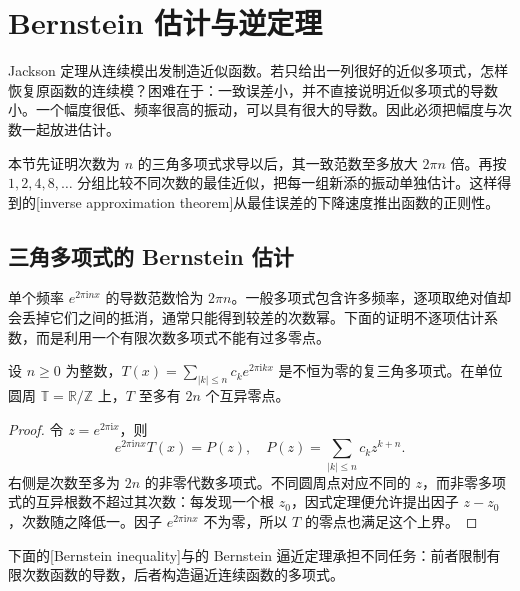 \section{Bernstein 估计与逆定理}
\label{b2:sec:approximation-inverse}

Jackson 定理从连续模出发制造近似函数。若只给出一列很好的近似多项式，怎样恢复原函数的连续模？困难在于：一致误差小，并不直接说明近似多项式的导数小。一个幅度很低、频率很高的振动，可以具有很大的导数。因此必须把幅度与次数一起放进估计。

\ProseParagraphBreak

本节先证明次数为 \(n\) 的三角多项式求导以后，其一致范数至多放大 \(2\pi n\) 倍。再按 \(1,2,4,8,\ldots\) 分组比较不同次数的最佳近似，把每一组新添的振动单独估计。这样得到的[inverse approximation theorem]从最佳误差的下降速度推出函数的正则性。

\subsection{三角多项式的 Bernstein 估计}
\label{b2:subsec:020903}

单个频率 \(e^{2\pi\mathrm i nx}\) 的导数范数恰为 \(2\pi n\)。一般多项式包含许多频率，逐项取绝对值却会丢掉它们之间的抵消，通常只能得到较差的次数幂。下面的证明不逐项估计系数，而是利用一个有限次数多项式不能有过多零点。

\begin{lemma}
\label{b2:lem:approximation-trigonometric-zeros}
设 \(n\geq0\) 为整数，\(T(x)=\sum_{|k|\leq n}c_ke^{2\pi\mathrm i kx}\) 是不恒为零的复三角多项式。在单位圆周 \(\mathbb T=\mathbb R/\mathbb Z\) 上，\(T\) 至多有 \(2n\) 个互异零点。
\end{lemma}
\begin{proof}
令 \(z=e^{2\pi\mathrm i x}\)，则
\[
 e^{2\pi\mathrm i nx}T(x)=P(z),
 \quad P(z)=\sum_{|k|\leq n}c_kz^{k+n}.
\]
右侧是次数至多为 \(2n\) 的非零代数多项式。不同圆周点对应不同的 \(z\)，而非零多项式的互异根数不超过其次数：每发现一个根 \(z_0\)，因式定理便允许提出因子 \(z-z_0\)，次数随之降低一。因子 \(e^{2\pi\mathrm i nx}\) 不为零，所以 \(T\) 的零点也满足这个上界。
\end{proof}

下面的[Bernstein inequality]与的 Bernstein 逼近定理承担不同任务：前者限制有限次数函数的导数，后者构造逼近连续函数的多项式。

